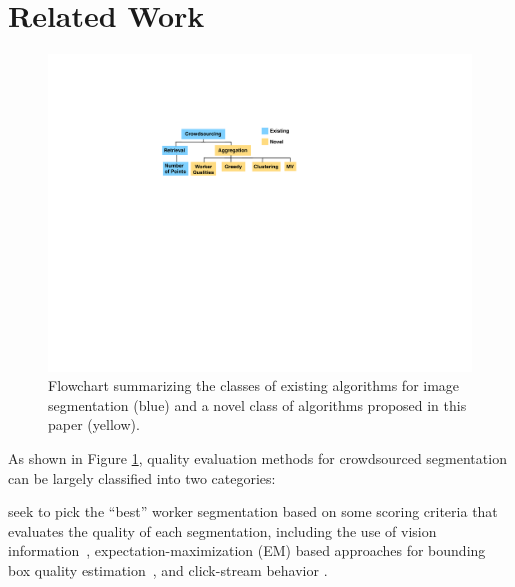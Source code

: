 \section{Related Work\label{sec:related}}
\begin{figure}[h!]
\centering
\includegraphics[width=0.8\linewidth]{plots/flowchart.pdf}
\caption{Flowchart summarizing the classes of existing algorithms for image segmentation (blue) and a novel class of algorithms proposed in this paper (yellow).} %
\label{flowchart}
\setlength{\belowcaptionskip}{-15pt} 
\end{figure}
As shown in Figure \ref{flowchart}, quality evaluation methods for crowdsourced segmentation can be largely classified into two categories:

 seek to pick the ``best'' worker segmentation based on some scoring criteria that evaluates the quality of each segmentation, including the use of vision information~\cite{Vittayakorn2011,Russakovsky2015}, expectation-maximization (EM) based approaches for bounding box quality estimation~\cite{OCWelinder2010}, and click-stream behavior \cite{Cabezas2015,Sameki2015,Sorokin2008}.

